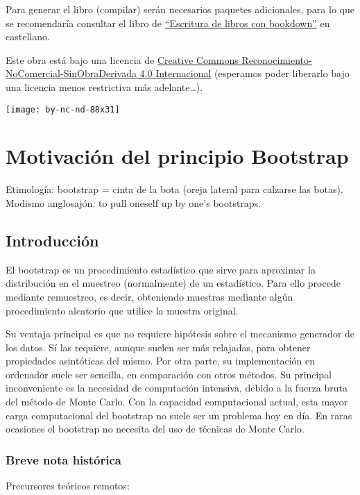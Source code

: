 \documentclass[]{book}
\theoremstyle{break}
\theoremstyle{definition}
\theoremstyle{definition}
\theoremstyle{definition}
\theoremstyle{remark}
\begin{document}
Para generar el libro (compilar) serán necesarios paquetes adicionales,
para lo que se recomendaría consultar el libro de
\href{https://rubenfcasal.github.io/bookdown_intro}{``Escritura de
libros con bookdown''} en castellano.

Este obra está bajo una licencia de
\href{https://creativecommons.org/licenses/by-nc-nd/4.0/deed.es_ES}{Creative
Commons Reconocimiento-NoComercial-SinObraDerivada 4.0 Internacional}
(esperamos poder liberarlo bajo una licencia menos restrictiva más
adelante\ldots{}).

\texttt{[image: by-nc-nd-88x31]}

\chapter{Motivación del principio Bootstrap}\label{intro}

Etimología: bootstrap = cinta de la bota (oreja lateral para calzarse
las botas). Modismo anglosajón: to pull oneself up by one's bootstraps.

\section{Introducción}\label{introducciuxf3n}

El bootstrap es un procedimiento estadístico que sirve para aproximar la
distribución en el muestreo (normalmente) de un estadístico. Para ello
procede mediante remuestreo, es decir, obteniendo muestras mediante
algún procedimiento aleatorio que utilice la muestra original.

Su ventaja principal es que no requiere hipótesis sobre el mecanismo
generador de los datos. Sí las requiere, aunque suelen ser más
relajadas, para obtener propiedades asintóticas del mismo. Por otra
parte, su implementación en ordenador suele ser sencilla, en comparación
con otros métodos. Su principal inconveniente es la necesidad de
computación intensiva, debido a la fuerza bruta del método de Monte
Carlo. Con la capacidad computacional actual, esta mayor carga
computacional del bootstrap no suele ser un problema hoy en día. En
raras ocasiones el bootstrap no necesita del uso de técnicas de Monte
Carlo.

\subsection{Breve nota histórica}\label{breve-nota-histuxf3rica}

Precursores teóricos remotos:
\end{document}
